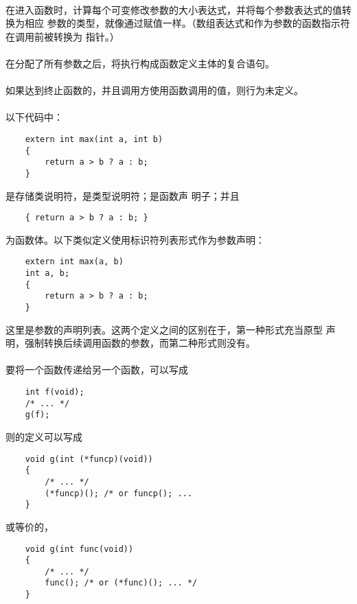{\paragraph{}
在进入函数时，计算每个可变修改参数的大小表达式，并将每个参数表达式的值转换为相应
参数的类型，就像通过赋值一样。（数组表达式和作为参数的函数指示符在调用前被转换为
指针。）

\paragraph{}
在分配了所有参数之后，将执行构成函数定义主体的复合语句。

\paragraph{}
如果达到终止函数的\tm{\}}，并且调用方使用函数调用的值，则行为未定义。

\paragraph{}
\ex 以下代码中：
\begin{lstlisting}
    extern int max(int a, int b)
    {
        return a > b ? a : b;
    }
\end{lstlisting}
是存储类说明符，是类型说明符；是函数声
明子；并且
\begin{lstlisting}
    { return a > b ? a : b; }
\end{lstlisting}
为函数体。以下类似定义使用标识符列表形式作为参数声明：
\begin{lstlisting}
    extern int max(a, b)
    int a, b;
    {
        return a > b ? a : b;
    }
\end{lstlisting}
这里是参数的声明列表。这两个定义之间的区别在于，第一种形式充当原型
声明，强制转换后续调用函数的参数，而第二种形式则没有。

\paragraph{}
\ex 要将一个函数传递给另一个函数，可以写成
\begin{lstlisting}
    int f(void);
    /* ... */
    g(f);
\end{lstlisting}
则的定义可以写成
\begin{lstlisting}
    void g(int (*funcp)(void))
    {
        /* ... */
        (*funcp)(); /* or funcp(); ...
    }
\end{lstlisting}
或等价的，
\begin{lstlisting}
    void g(int func(void))
    {
        /* ... */
        func(); /* or (*func)(); ... */
    }
\end{lstlisting}

}
